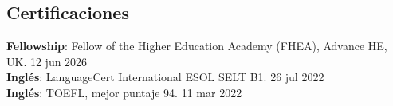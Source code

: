 \documentclass[margin,line]{res}
\begin{document}
\begin{resume}
\section{\sc Certificaciones}
{\bf Fellowship}: Fellow of the Higher Education Academy (FHEA), Advance HE, UK. \hfill 12 jun 2026\\
{\bf Inglés}: LanguageCert International ESOL SELT B1. \hfill 26 jul 2022\\
{\bf Inglés}: TOEFL, mejor puntaje 94. \hfill 11 mar 2022\\







\end{resume}
\end{document}
